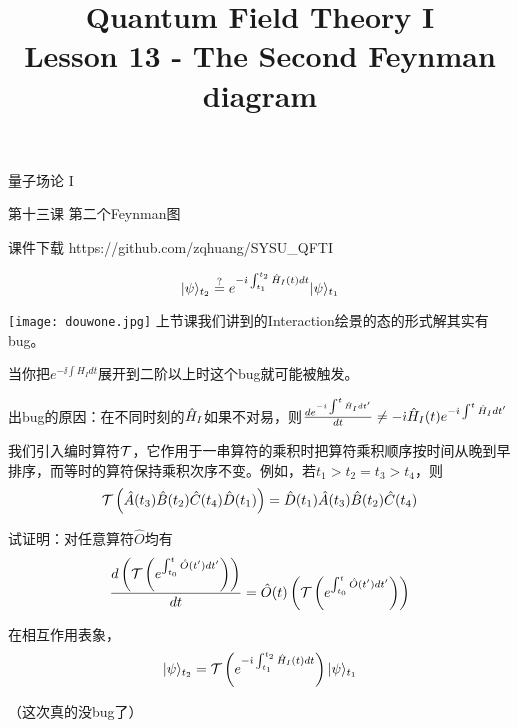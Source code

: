 \documentclass[CJK]{beamer}
\title{Quantum Field Theory I \\ Lesson 13 - The Second Feynman diagram}
\author{}
\date{}
\begin{document}
\begin{frame}
 
\begin{center}
\begin{Large}
\bch
量子场论 I 

{\vskip 0.3in}

第十三课 第二个Feynman图

\ech
\end{Large}
\end{center}

\vskip 0.2in

\bch
课件下载
\ech
https://github.com/zqhuang/SYSU\_QFTI

\end{frame}

\begin{frame}
\bch

$$|\psi\rangle_{t_2} \stackrel{?}{=} e^{-{\dot{\imath}}\int_{t_1}^{t_2} {\hat{H}}_I(t) dt} |\psi\rangle_{t_1}$$

\texttt{[image: douwone.jpg]}
\emini
{}
上节课我们讲到的Interaction绘景的态的形式解其实有bug。

当你把$e^{-\ii\int H_Idt}$展开到二阶以上时这个bug就可能被触发。

\emini


\skipline
{\small
出bug的原因：在不同时刻的${\hat{H}}_I$如果不对易，则$\frac{d e^{-{\dot{\imath}}\int^t {\hat{H}}_I dt'}}{dt} \ne -{\dot{\imath}} {\hat{H}}_I(t) e^{-{\dot{\imath}}\int^t {\hat{H}}_I dt'}$
}
\skipline
\ech
\end{frame}

\begin{frame}
\bch
我们引入编时算符${\mathcal{T}}$，它作用于一串算符的乘积时把算符乘积顺序按时间从晚到早排序，而等时的算符保持乘积次序不变。例如，若$t_1>t_2 = t_3>t_4$，则
$$\mathcal{T}\left(\hat{A}(t_3)\hat{B}(t_2)\hat{C}(t_4)\hat{D}(t_1)\right) = \hat{D}(t_1)\hat{A}(t_3)\hat{B}(t_2)\hat{C}(t_4)$$

\skipline
试证明：对任意算符$\hat{O}$均有
$$\frac{d \left(\mathcal{T}\left(e^{\int^t_{t_0} \hat{O}(t')dt'}\right)\right)}{dt} = \hat{O}(t) \left(\mathcal{T}\left(e^{\int^t_{t_0} \hat{O}(t')dt'}\right)\right)$$

\ech
\end{frame}

\begin{frame}
\bch
在相互作用表象，
$$|\psi\rangle_{t_2} = \mathcal{T}\left( e^{-{\dot{\imath}}\int_{t_1}^{t_2} {\hat{H}}_I(t) dt} \right)|\psi\rangle_{t_1}$$

（这次真的没bug了）
\ech
\end{frame}
\end{document}

